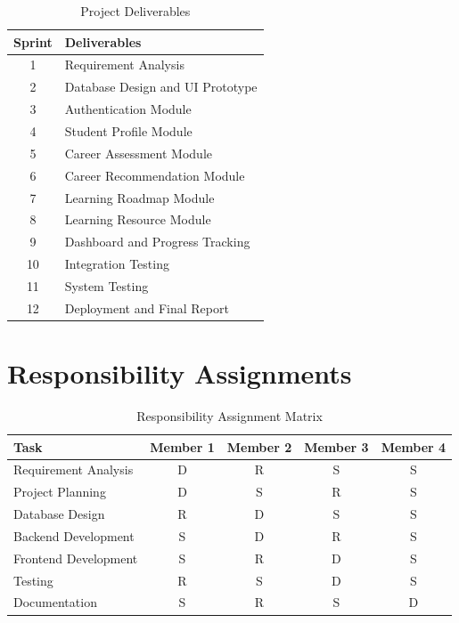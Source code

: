 \begin{table}[H]
\centering
\caption{Project Deliverables}
\label{tab:deliverables}

\begin{tabular}{|c|p{9cm}|}
\hline
\textbf{Sprint} & \textbf{Deliverables}\\
\hline
1 & Requirement Analysis\\
\hline
2 & Database Design and UI Prototype\\
\hline
3 & Authentication Module\\
\hline
4 & Student Profile Module\\
\hline
5 & Career Assessment Module\\
\hline
6 & Career Recommendation Module\\
\hline
7 & Learning Roadmap Module\\
\hline
8 & Learning Resource Module\\
\hline
9 & Dashboard and Progress Tracking\\
\hline
10 & Integration Testing\\
\hline
11 & System Testing\\
\hline
12 & Deployment and Final Report\\
\hline
\end{tabular}
\end{table}


\section{Responsibility Assignments}

\begin{table}[H]
\centering
\caption{Responsibility Assignment Matrix}
\label{tab:responsibility}

\begin{tabular}{|l|c|c|c|c|}
\hline
\textbf{Task} & \textbf{Member 1} & \textbf{Member 2} & \textbf{Member 3} & \textbf{Member 4}\\
\hline
Requirement Analysis & D & R & S & S\\
\hline
Project Planning & D & S & R & S\\
\hline
Database Design & R & D & S & S\\
\hline
Backend Development & S & D & R & S\\
\hline
Frontend Development & S & R & D & S\\
\hline
Testing & R & S & D & S\\
\hline
Documentation & S & R & S & D\\
\hline
\end{tabular}
\end{table}

